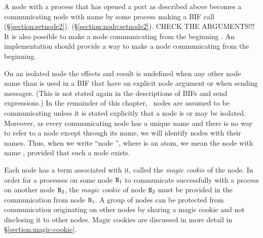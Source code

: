 A node with a 
process that has opened a port  as described above
becomes a communicating node with name  by some process making a BIF call
\ifOld {}
(\S\ref{section:setnode2}).\fi
\ifStd {}
(\S\ref{section:node:setnode2}).\fi
CHECK THE ARGUMENTS!!!
\ifOld It is also possible to make a node communicating from the beginning
\cite[pp.~5--9]{otp-dev-ref}.\fi
\ifStd An implementation should provide a
way to make a node communicating from the beginning.\fi
{}

On an isolated node the effects and result is undefined when
any other node name than
is used in a BIF that have an explicit node argument
or when sending messages.  (This is not stated again in the descriptions
of BIFs and send expressions.)
In the remainder of this chapter, \Erlang\ nodes are assumed to be
communicating unless
it is stated explicitly that a node is or may be isolated.  Moreover, as
every communicating node has a unique name and there is no way to refer to a node except
through its name, we will identify nodes with their names.  Thus, when
we write ``node '', where  is an atom, we mean the node with
name , provided that such a node exists.

Each node has a term associated with it, called the \emph{magic cookie} of the node.
In order for a processes on some node ${\tt{\sl N}}_1$ to communicate successfully with a
process on another node ${\tt{\sl N}}_2$, the \emph{magic cookie} of node
${\tt{\sl N}}_2$ must be provided
in the communication from node ${\tt{\sl N}}_1$.
A group of nodes can be protected from communication
originating on other nodes by sharing a magic cookie and not disclosing it
to other nodes.  Magic cookies are discussed in more detail in
\S\ref{section:magic-cookie}.

